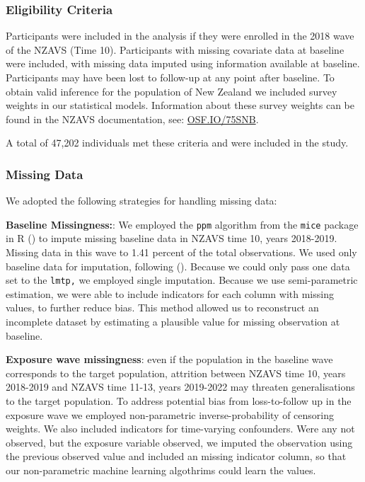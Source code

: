 \documentclass[
  single column]{article}
\begin{document}
\subsubsection{Eligibility Criteria}\label{eligibility-criteria}

Participants were included in the analysis if they were enrolled in the
2018 wave of the NZAVS (Time 10). Participants with missing covariate
data at baseline were included, with missing data imputed using
information available at baseline. Participants may have been lost to
follow-up at any point after baseline. To obtain valid inference for the
population of New Zealand we included survey weights in our statistical
models. Information about these survey weights can be found in the NZAVS
documentation, see:
\href{https://doi.org/10.17605/OSF.IO/75SNB}{OSF.IO/75SNB}.

A total of 47,202 individuals met these criteria and were included in
the study.

\subsubsection{Missing Data}\label{missing-data}

We adopted the following strategies for handling missing data:

\textbf{Baseline Missingness:}: We employed the \texttt{ppm} algorithm
from the \texttt{mice} package in R () to impute missing baseline data in NZAVS time 10, years
2018-2019. Missing data in this wave to 1.41 percent of the total
observations. We used only baseline data for imputation, following
(). Because we could only pass one data set to the \texttt{lmtp,} we
employed single imputation. Because we use semi-parametric estimation,
we were able to include indicators for each column with missing values,
to further reduce bias. This method allowed us to reconstruct an
incomplete dataset by estimating a plausible value for missing
observation at baseline.

\textbf{Exposure wave missingness}: even if the population in the
baseline wave corresponds to the target population, attrition between
NZAVS time 10, years 2018-2019 and NZAVS time 11-13, years 2019-2022 may
threaten generalisations to the target population. To address potential
bias from loss-to-follow up in the exposure wave we employed
non-parametric inverse-probability of censoring weights. We also
included indicators for time-varying confounders. Were any not observed,
but the exposure variable observed, we imputed the observation using the
previous observed value and included an missing indicator column, so
that our non-parametric machine learning algothrims could learn the
values.
\end{document}
